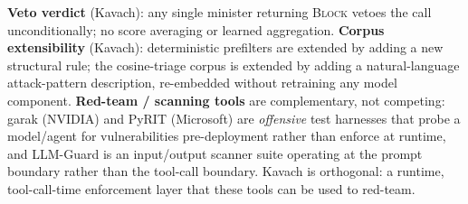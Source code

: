 \documentclass[sigconf,anonymous,review]{acmart}
\begin{document}
\begin{table}[tp]
\begin{tabular}{@{}lllllrr@{}}
\bottomrule
\end{tabular}

\medskip
\noindent\small
{}
\textbf{Veto verdict} (Kavach): any single minister returning \textsc{Block}
vetoes the call unconditionally; no score averaging or learned aggregation.
\textbf{Corpus extensibility} (Kavach): deterministic prefilters are extended by
adding a new structural rule; the cosine-triage corpus is extended by adding a
natural-language attack-pattern description, re-embedded without retraining
any model component.
\textbf{Red-team / scanning tools} are complementary, not competing: garak
\cite{garak2024} (NVIDIA) and PyRIT \cite{pyrit2024} (Microsoft) are
\emph{offensive} test harnesses that probe a model/agent for vulnerabilities
pre-deployment rather than enforce at runtime, and LLM-Guard \cite{llmguard2024}
is an input/output scanner suite operating at the prompt boundary rather than the
tool-call boundary. Kavach is orthogonal: a runtime, tool-call-time enforcement
layer that these tools can be used to red-team.


\end{table}
\end{document}
